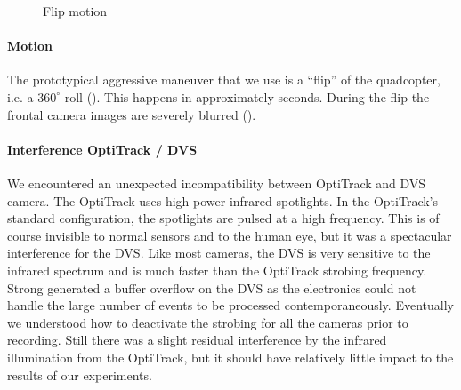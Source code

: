 \begin{figure}
\begin{centering}
\par\end{centering}

\begin{centering}
\par\end{centering}

\caption{Flip motion}
\end{figure}



\paragraph{Motion}

The prototypical aggressive maneuver that we use is a ``flip'' of
the quadcopter, i.e. a $360^{\circ}$ roll ().
This happens in approximately \xxx seconds. During the flip the frontal
camera images are severely blurred (). 




\paragraph{Interference OptiTrack / DVS}

We encountered an unexpected incompatibility between OptiTrack and
DVS camera. The OptiTrack uses high-power infrared spotlights. In
the OptiTrack's standard configuration, the spotlights are pulsed
at a high frequency. This is of course invisible to normal sensors
and to the human eye, but it was a spectacular interference for the
DVS. Like most cameras, the DVS is very sensitive to the infrared
spectrum and is much faster than the OptiTrack strobing frequency.
Strong generated a buffer overflow on the DVS as the electronics could
not handle the large number of events to be processed contemporaneously.
Eventually we understood how to deactivate the strobing for all the
cameras prior to recording. Still there was a slight residual interference
by the infrared illumination from the OptiTrack, but it should have
relatively little impact to the results of our experiments.


